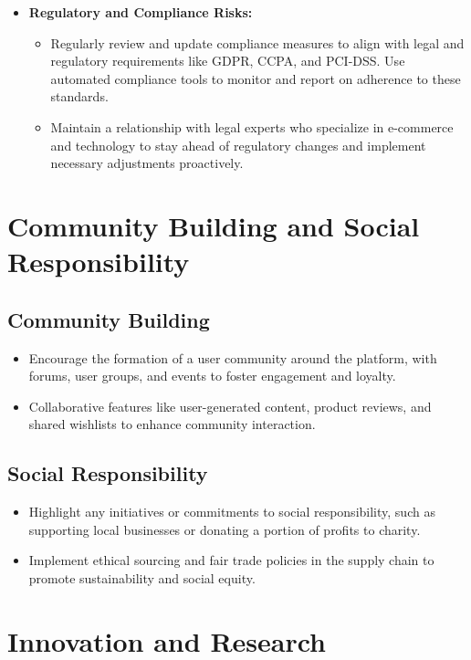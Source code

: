 \documentclass[11pt]{article}
\begin{document}
\begin{itemize}
\begin{itemize}
		\end{itemize}
		\item \textbf{Regulatory and Compliance Risks:}
		\begin{itemize}
			\item Regularly review and update compliance measures to align with legal and regulatory requirements like GDPR, CCPA, and PCI-DSS. Use automated compliance tools to monitor and report on adherence to these standards.
			\item Maintain a relationship with legal experts who specialize in e-commerce and technology to stay ahead of regulatory changes and implement necessary adjustments proactively.
		\end{itemize}
	\end{itemize}
	
	\section*{Community Building and Social Responsibility}
	
	\subsection*{Community Building}
	\begin{itemize}
		\item Encourage the formation of a user community around the platform, with forums, user groups, and events to foster engagement and loyalty.
		\item Collaborative features like user-generated content, product reviews, and shared wishlists to enhance community interaction.
	\end{itemize}
	
	\subsection*{Social Responsibility}
	\begin{itemize}
		\item Highlight any initiatives or commitments to social responsibility, such as supporting local businesses or donating a portion of profits to charity.
		\item Implement ethical sourcing and fair trade policies in the supply chain to promote sustainability and social equity.
	\end{itemize}
	
	\section*{Innovation and Research}
	
\end{document}
